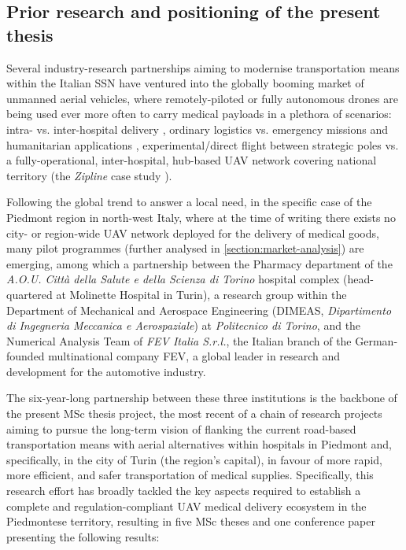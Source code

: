 \subsection{Prior research and positioning of the present thesis}\label{section:prior-research}
Several industry-research partnerships aiming to modernise transportation means within the Italian SSN have ventured into the globally booming market of unmanned aerial vehicles, where remotely-piloted or fully autonomous drones are being used ever more often to carry medical payloads in a plethora of scenarios: intra- vs. inter-hospital delivery \cite{Balasingam2017}, ordinary logistics vs. emergency missions and humanitarian applications \cite{Scott2017}, experimental/direct flight between strategic poles \cite{Odigie2021} vs. a fully-operational, inter-hospital, hub-based UAV network covering national territory (the \textit{Zipline} case study \cite{Gangwal2019}). 

Following the global trend to answer a local need, in the specific case of the Piedmont region in north-west Italy, where at the time of writing there exists no city- or region-wide UAV network deployed for the delivery of medical goods, many pilot programmes (further analysed in \cref{section:market-analysis}) are emerging, among which a partnership between the Pharmacy department of the \textit{A.O.U. Città della Salute e della Scienza di Torino} hospital complex (head-quartered at Molinette Hospital in Turin), a research group within the Department of Mechanical and Aerospace Engineering (DIMEAS, \textit{Dipartimento di Ingegneria Meccanica e Aerospaziale}) at \textit{Politecnico di Torino}, and the Numerical Analysis Team of \textit{FEV Italia S.r.l.}, the Italian branch of the German-founded multinational company FEV, a global leader in research and development for the automotive industry. 

The six-year-long partnership between these three institutions is the backbone of the present MSc thesis project, the most recent of a chain of research projects aiming to pursue the long-term vision of flanking the current road-based transportation means with aerial alternatives within hospitals in Piedmont and, specifically, in the city of Turin (the region's capital), in favour of more rapid, more efficient, and safer transportation of medical supplies. Specifically, this research effort has broadly tackled the key aspects required to establish a complete and regulation-compliant UAV medical delivery ecosystem in the Piedmontese territory, resulting in five MSc theses and one conference paper presenting the following results:

